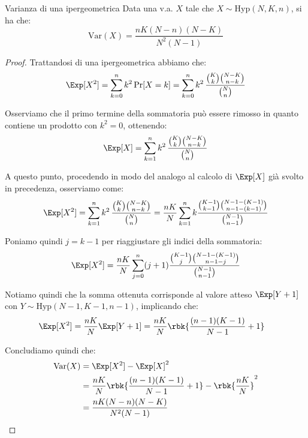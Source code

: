 \documentclass[a4paper, 12pt]{report}
\begin{document}
    \begin{framedprop}{Varianza di una ipergeometrica}
        Data una v.a. $X$ tale che $X \sim \mathrm{Hyp}(N,K,n)$, si ha che:
        \[\mathrm{Var}(X) = \frac{nK(N-n)(N-K)}{N^2(N-1)}\]
    \end{framedprop}

    \begin{proof}
        Trattandosi di una ipergeometrica abbiamo che:
        \[\begin{split}
            \Exp[X^2] &= \sum_{k = 0}^n k^2 \Pr[X = k] = \sum_{k = 0}^n k^2 \, \frac{\binom{K}{k} \binom{N-K}{n-k}}{\binom{N}{n}} \\
        \end{split}\]

        Osserviamo che il primo termine della sommatoria può essere rimosso in quanto contiene un prodotto con $k^2 = 0$, ottenendo:
        \[\Exp[X] = \sum_{k = 1}^n k^2 \, \frac{\binom{K}{k} \binom{N-K}{n-k}}{\binom{N}{n}}\]

        A questo punto, procedendo in modo del analogo al calcolo di $\Exp[X]$ già svolto in precedenza, osserviamo come:
        \[\begin{split}
            \Exp[X^2] &= \sum_{k = 1}^n k^2 \, \frac{\binom{K}{k} \binom{N-K}{n-k}}{\binom{N}{n}} = \frac{nK}{N} \sum_{k = 1}^n k \frac{\binom{K-1}{k-1} \binom{N-1-(K-1)}{n-1-(k-1)}}{\binom{N-1}{n-1}}\\
        \end{split}\]

        Poniamo quindi $j = k-1$ per riaggiustare gli indici della sommatoria:
        \[\begin{split}
            \Exp[X^2] &= \frac{nK}{N} \sum_{j = 0}^n (j+1) \frac{\binom{K-1}{j} \binom{N-1-(K-1)}{n-1-j}}{\binom{N-1}{n-1}}\\
        \end{split}\]

        Notiamo quindi che la somma ottenuta corrisponde al valore atteso $\Exp[Y+1]$ con $Y \sim \mathrm{Hyp}(N-1, K-1, n-1)$, implicando che:
        \[\begin{split}
            \Exp[X^2] &= \frac{nK}{N} \Exp[Y+1] = \frac{nK}{N}\rbk{\frac{(n-1)(K-1)}{N-1} + 1}
        \end{split}\]

        Concludiamo quindi che:
        \[\begin{split}
            \mathrm{Var}(X) &= \Exp[X^2] - \Exp[X]^2 \\
            &= \frac{nK}{N}\rbk{\frac{(n-1)(K-1)}{N-1} + 1} - \rbk{\frac{nK}{N}}^2 \\
            &= \frac{nK(N-n)(N-K)}{N^2(N-1)}
        \end{split}\]
    \end{proof}
\end{document}
